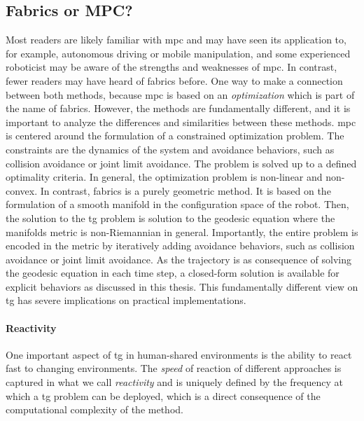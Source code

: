 \subsection{Fabrics or MPC?}
\label{sec:discussion_fabrics_or_mpc}

Most readers are likely familiar with \acl{mpc} and may have seen its application
to, for example, autonomous driving or mobile manipulation, and some 
experienced roboticist may be aware of the strengths and weaknesses of
\ac{mpc}. In contrast, fewer readers may have heard of \ac{fabrics} before.
One way to make a connection between both methods, because
\ac{mpc} is based on an \textit{optimization} which is part
of the name of \acf{fabrics}.
However, the methods are
fundamentally different,
and it is important to analyze the differences and similarities between
these methods.
\ac{mpc} is centered around the
formulation of a constrained optimization problem. The constraints are
the dynamics of the system and avoidance behaviors, such as collision avoidance
or joint limit avoidance. The problem is solved up to a defined optimality 
criteria. In general, the optimization problem is non-linear and non-convex.
In contrast, \ac{fabrics} is a purely geometric method. It is based on the
formulation of a smooth manifold in the configuration space of the robot.
Then, the solution to the \ac{tg} problem is solution to the geodesic equation
where the manifolds metric is non-Riemannian in general. Importantly, the entire
problem is encoded in the metric by iteratively adding avoidance
behaviors, such as collision avoidance or joint limit avoidance. As the
trajectory is as consequence of solving the geodesic equation in each time step, a
closed-form solution is available for explicit behaviors as discussed in this
thesis.
This fundamentally different view on \ac{tg} has severe implications on
practical implementations.

\paragraph{Reactivity}
\label{par:discussion_reactivity}

One important aspect of \ac{tg} in human-shared environments is the ability to
react fast to changing environments. The \textit{speed} of reaction
of different approaches is captured in what we call
\textit{reactivity} and is uniquely defined by the frequency
at which a \ac{tg} problem can be deployed, which is a
direct consequence of the computational complexity of the
method.

